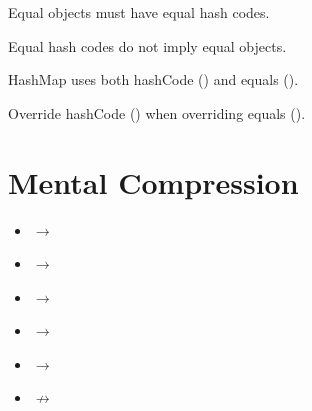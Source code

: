 \documentclass[11pt,a4paper]{book}
\begin{document}

\begin{rosettarule}

Equal objects must have
equal hash codes.

\end{rosettarule}


\begin{rosettarule}

Equal hash codes do not imply
equal objects.

\end{rosettarule}


\begin{rosettarule}

HashMap uses both
hashCode () and equals ().

\end{rosettarule}


\begin{rosettarule}

Override hashCode ()
when overriding equals ().

\end{rosettarule}


\section{Mental Compression}

\begin{itemize}
\item [ ] $\rightarrow$ 
\item [ ] $\rightarrow$  
\item [ ] $\rightarrow$ 
\item [ ] $\rightarrow$ 
\item [ ] $\rightarrow$ 
\item [ ] $\not\rightarrow$ 
\end{itemize}
\end{document}
